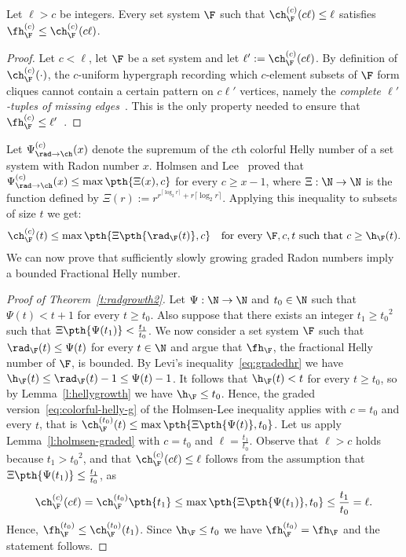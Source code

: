 %
%
\begin{lemma}\label{l:holmsen-graded}
Let $\ell > c$ be integers. Every set system $\F$ such that $\ch^{(c)}_\F(c\ell) \leq \ell$ satisfies $\fh^{(c)}_\F \leq \ch^{(c)}_\F(c\ell)$.
\end{lemma}
\begin{proof}
  Let $c< \ell$, let $\F$ be a set system and let $\ell':=\ch^{(c)}_\F(c\ell)$. By definition of $\ch^{(c)}_\F(\cdot)$, the $c$-uniform hypergraph recording which $c$-element subsets of $\F$ form cliques cannot contain a certain pattern on $c\ell'$ vertices, namely the \emph{complete $\ell'$-tuples of missing edges}~\cite[$\mathsection 3$]{Holmsen2021}. This is the only property needed to ensure that $\fh^{(c)}_\F \leq \ell'$~\cite[Theorem~1.2]{Holmsen2020}.
\end{proof}
%
\medskip
%
  Let $\Psi_{\rad \to \ch}^{(c)}(x)$ denote the supremum of the $c$th colorful Helly number of a set system with Radon number $x$. Holmsen and Lee~\cite[Theorem~2.2]{Holmsen2021} proved that $\Psi_{\rad \to \ch}^{(c)}(x) \le \max\pth{\Xi(x),c}$ for every $c \ge x-1$, where  $\Xi: \N \to \N$ is the function defined by $\Xi(r) := r^{r^{\lceil \log_2r \rceil}+r\lceil \log_2r \rceil}$. Applying this inequality to subsets of size $t$ we get:
%
\begin{align}\label{eq:colorful-helly-g}
  \ch^{(c)}_\F(t) \leq \max\pth{\Xi\pth{\rad_\F(t)},c} && \text{for every } \F, c, t \text{ such that } c \ge \h_\F(t).
\end{align}
%
\medskip
%
We can now prove that sufficiently slowly growing graded Radon numbers imply a bounded Fractional Helly number.
%
\begin{proof}[Proof of Theorem~\ref{t:radgrowth2}]
  Let $\Psi: \N\rightarrow \N$ and $t_0 \in \N$ such that $\Psi(t) < t+1$ for every $t \ge t_0$. Also suppose that there exists an integer $t_1 \ge {t_0}^2$ such that $\Xi\pth{\Psi(t_1)} < \frac{t_1}{t_0}$. We now consider a set system $\F$ such that $\rad_\F(t) \le \Psi(t)$ for every $t \in \N$ and argue that $\fh_\F$, the fractional Helly number of $\F$, is bounded. 
%
  \medskip
%
  By Levi's inequality~\eqref{eq:gradedhr} we have $\h_\F(t) \le \rad_\F(t) -1 \le \Psi(t) -1$. It follows that $\h_\F(t) < t$ for every $t \ge t_0$, so by Lemma~\ref{l:hellygrowth} we have $\h_\F \le t_0$. Hence, the graded version~\eqref{eq:colorful-helly-g} of the Holmsen-Lee inequality applies with $c=t_0$ and every $t$, that is $\ch^{(t_0)}_\F(t) \leq \max\pth{\Xi\pth{\Psi(t)},t_0}$.
%
  \medskip
%
  Let us apply Lemma~\ref{l:holmsen-graded} with $c=t_0$ and $\ell = \frac{t_1}{t_0}$. Observe that $\ell > c$ holds because $t_1 > {t_0}^2$, and that $\ch^{(c)}_\F(c\ell) \le \ell$ follows from the assumption that $\Xi\pth{\Psi(t_1)} \le \frac{t_1}{t_0}$, as
%
  \[  \ch^{(c)}_\F(c\ell) = \ch^{(t_0)}_\F\pth{t_1} \le \max\pth{\Xi\pth{\Psi(t_1)},t_0} \le \frac{t_1}{t_0} = \ell.\]
%
Hence, $\fh^{(t_0)}_\F \leq \ch^{(t_0)}_\F(t_1)$. Since $\h_\F \le t_0$ we have $\fh^{(t_0)}_\F = \fh_\F$ and the statement follows.  
\end{proof}
%
%
%
%
%
\appendix
%
